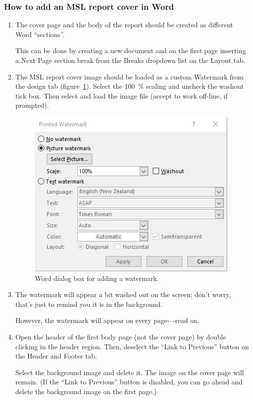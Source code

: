 \subsubsection{How to add an MSL report cover in Word}
\begin{enumerate}
\item	The cover page and the body of the report should be created as different Word ``sections''. 

This can be done by creating a new document and on the first page inserting a Next Page section break from the Breaks dropdown list on the Layout tab.
\item 	The MSL report cover image should be loaded as a custom Watermark from the design tab (figure~\ref{fig:word_watermark_dialog}). Select the \SI{100}{\%} scaling and uncheck the washout tick box. Then select and load the image file (accept to work off-line, if prompted).
\begin{figure}[h]
\centering
\includegraphics[scale=1]{pictures/word_watermark_dialog}
\caption{Word dialog box for adding a watermark.}
\label{fig:word_watermark_dialog}
\end{figure}
\item	The watermark will appear a bit washed out on the screen; don't worry, that's just to remind you it is in the background. 

However, the watermark will appear on every page-–-read on. 
\item Open the header of the first body page (not the cover page) by double clicking in the header region. Then, deselect the ``Link to Previous'' button on the Header and Footer tab. 

Select the background image and delete it. The image on the cover page will remain. (If the ``Link to Previous'' button is disabled, you can go ahead and delete the background image on the first page.)

\end{enumerate}

